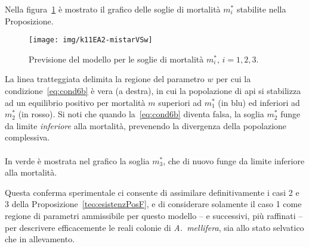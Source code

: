 Nella figura~\ref{img:kh11expA24} è mostrato il grafico delle soglie di mortalità $m_i^*$ stabilite nella Proposizione.
\begin{figure}[hbt]
    \centering
    \texttt{[image: img/k11EA2-mistarVSw]}

    \caption[Esperimento A2, soglie di mortalità]{Previsione del modello per le soglie di mortalità $m_i^*$, $i=1,2,3$.}

    \label{img:kh11expA24}
\end{figure}

La linea tratteggiata delimita la regione del parametro $w$ per cui la condizione~\eqref{eq:cond6b} è vera (a destra),
in cui la popolazione di api si stabilizza ad un equilibrio positivo per mortalità $m$ superiori ad $m_1^*$ (in blu)
ed inferiori ad $m_2^*$ (in rosso). Si noti che quando la~\eqref{eq:cond6b} diventa falsa, la soglia $m_2^*$ funge
da limite \emph{inferiore} alla mortalità, prevenendo la divergenza della popolazione complessiva.

\paragraph{}
In verde è mostrata nel grafico la soglia $m_3^*$, che di nuovo funge da limite inferiore alla mortalità.

Questa conferma sperimentale ci consente di assimilare definitivamente i casi 2 e 3 della
Proposizione~\ref{teo:esistenzPosF}, e di considerare solamente il caso 1 come regione di parametri ammissibile
per questo modello -- e successivi, più raffinati -- per descrivere efficacemente le reali colonie di \emph{A.~mellifera},
sia allo stato selvatico che in allevamento.
